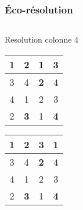 \begin{frame}
    \frametitle{Éco-résolution}
    	\begin{columns}
    \begin{column}{5cm}
    \begin{block}{Resolution colonne 4}
	\begin{center}
         \begin{tabular}{|c|c| |c|c| }
               \hline
               \textbf{1}&2&{\color{green} 1}&{\color{red} 3}\\
               \hline
               3&4&\textbf{2}&4\\
               \hline
               \hline
               4&1&2&3\\
               \hline
               2&\textbf{3}&1&\textbf{4}\\                      
            \hline
        \end{tabular}
    \end{center}
    \pause
    \begin{center}
         \begin{tabular}{|c|c| |c|c| }
               \hline
               \textbf{1}&2& 3&{\color{green} 1}\\
               \hline
               3&4&\textbf{2}&{\color{red} 4}\\
               \hline
               \hline
               4&1&2&3\\
               \hline
               2&\textbf{3}&1&\textbf{4}\\                      
            \hline
        \end{tabular}
    \end{center}
     \end{block} 

    \end{column}
    

\end{columns}
\end{frame}
